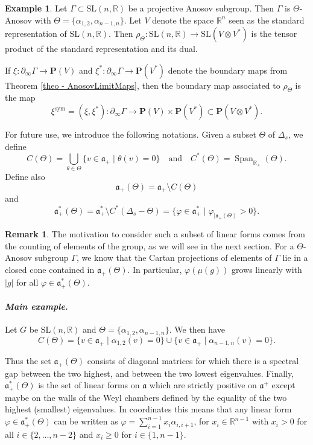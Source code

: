 \documentclass[JEP,XML,SOM,Unicode,NoEqCountersInSection,NoFloatCountersInSection,published]{cedram}
\newcommand{\quand}{\quad\text{and}\quad}
\newcommand{\sym}{\mathrm{sym}}
\theoremstyle{definition}
\newtheorem{example}[theo]{Example}
\newtheorem{rmk}[theo]{Remark}
\newcommand{\proj}{\mathbf{P}}
\newcommand{\R}{\mathbb{R}}
\newcommand{\SL}{\mathrm{SL}}
\newcommand{\fa}{\mathfrak{a}}
\DeclareMathOperator{\Span}{Span}
\let\phi\varphi
\let\G\Gamma
\begin{document}
\begin{example} \label{example - Symmetric boundary map}
Let $\Gamma \subset \SL(n,\R)$ be a projective Anosov subgroup. Then $\Gamma$ is $\Theta$\nobreakdash-Anosov with $\Theta = \{\alpha_{1,2}, \alpha_{n-1,n}\}$. Let $V$ denote the space $\R^n$ seen as the standard representation of $\SL(n,\R)$. Then $\rho_\Theta: \SL(n,\R) \to \SL(V\otimes V^*)$ is the tensor product of the standard representation and its dual.

If $\xi:\partial_\infty \G \to \proj (V)$ and $\xi^*:\partial_\infty \G \to \proj(V^*)$ denote the boundary maps from Theorem \ref{theo - AnosovLimitMaps}, then the boundary map associated to $\rho_\Theta$ is the map
\[\xi^{\sym} = (\xi, \xi^*): \partial_\infty \Gamma \to \proj(V)\times \proj(V^*) \subset \proj(V\otimes V^*).\]
\end{example}

For future use, we introduce the following notations. Given a subset $\Theta$ of $\Delta_s$, we define
\[C(\Theta) = \bigcup_{\theta \in \Theta}\{v\in \fa_+ \mid \theta(v) = 0\}\quand
C^*(\Theta) = \Span_{\R_+}(\Theta).\]
Define also
\[\fa_+(\Theta) = \fa_+ \setminus C(\Theta)\]
and
\[\fa_+^*(\Theta) = \fa_+^* \setminus C^*(\Delta_s -\Theta) = \{\phi \in \fa_+^*\mid \phi_{\vert \fa_+(\Theta)} >0\}.\]

\begin{rmk}
The motivation to consider such a subset of linear forms comes from the counting of elements of the group, as we will see in the next section. For a $\Theta$\nobreakdash-Anosov subgroup $\G$, we know that the Cartan projections of elements of $\G$ lie in a closed cone contained in $\fa_+(\Theta)$. In particular, $\phi(\mu(g))$ grows linearly with $|g|$ for all $\phi\in\fa_+^*(\Theta)$.
\end{rmk}

\paragraph{{\it Main example.}} Let $G$ be $\SL(n,\R)$ and $\Theta = \{\alpha_{1,2}, \alpha_{n-1,n}\}$. We then have
\[C(\Theta) = \{v\in \fa_+\mid \alpha_{1,2} (v) = 0 \}\cup \{v\in \fa_+\mid \alpha_{n-1,n} (v) = 0 \}.\]

Thus the set $\mathfrak{a}_+(\Theta)$ consists of diagonal matrices for which there is a spectral gap between the two highest, and between the two lowest eigenvalues.
Finally, $\fa_+^*(\Theta)$ is the set of linear forms on $\fa$ which are strictly positive on $\fa^+$ except maybe on the walls of the Weyl chambers defined by the equality of the two highest (\resp smallest) eigenvalues. In coordinates this means that any linear form $\phi\in \fa_+^*(\Theta)$ can be written as $\phi= \sum_{i=1}^{n-1} x_i \alpha_{i,i+1}$, for $x_i \in \R^{n-1}$ with $x_i> 0$ for all $i \in \{ 2, \dots, n-2\}$ and $x_i\geq 0$ for $i\in \{ 1, n-1\}$.
\end{document}
